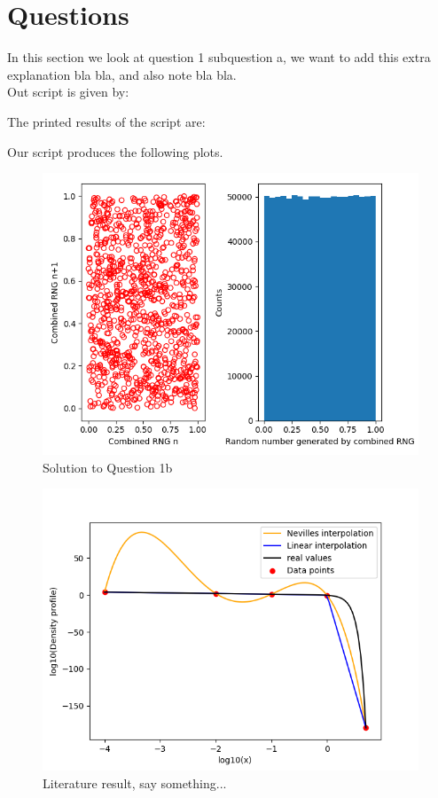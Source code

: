 \section{Questions}

In this section we look at question 1 subquestion a, 
we want to add this extra explanation bla bla, and also 
note bla bla. \\

Out script is given by:


The printed results of the script are:



Our script produces the following plots.

\begin{figure}[h!]
  \centering
  \includegraphics[width=0.9\linewidth]{./plots/RNG-test-results.png}
  \caption{Solution to Question 1b}
  \label{fig:fig1}
\end{figure}

\begin{figure}[h!]
  \centering
  \includegraphics[width=0.9\linewidth]{./plots/Log-Log_plot_interpolation.png}
  \caption{Literature result, say something...}
  \label{fig:fig2}
\end{figure}

